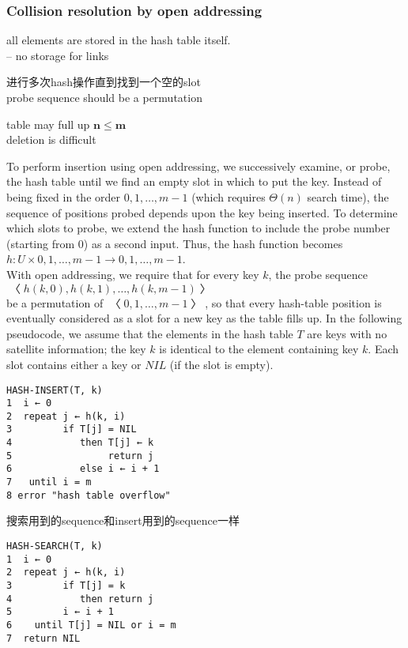 \documentclass{article}
\begin{document}
\subsubsection{Collision resolution by open addressing}
all elements are stored in the hash table itself.\\
-- no storage for links

进行多次hash操作直到找到一个空的slot\\
probe sequence should be a permutation

table may full up $\mathbf{n \leq m}$\\
deletion is difficult

To perform insertion using open addressing, we successively examine, or probe, the hash table until we find an empty slot in which to put the key. Instead of being fixed in the order $0, 1, \ldots, m - 1$ (which requires $\Theta(n)$ search time), the sequence of positions probed depends upon the key being inserted. To determine which slots to probe, we extend the hash function to include the probe number (starting from $0$) as a second input. Thus, the hash function becomes\\
$h : U \times {0, 1, \ldots, m - 1} \rightarrow {0, 1, \ldots, m - 1}$.\\
With open addressing, we require that for every key $k$, the probe sequence\\
$〈h(k,0),h(k,1), \ldots, h(k,m - 1)〉$\\
be a permutation of $〈0, 1, \ldots, m -1〉$, so that every hash-table position is eventually considered as a slot for a new key as the table fills up. In the following pseudocode, we assume that the elements in the hash table $T$ are keys with no satellite information; the key $k$ is identical to the element containing key $k$. Each slot contains either a key or $NIL$ (if the slot is empty).

\begin{verbatim}
HASH-INSERT(T, k)
1  i ← 0
2  repeat j ← h(k, i)
3         if T[j] = NIL
4            then T[j] ← k
5                 return j
6            else i ← i + 1
7   until i = m
8 error "hash table overflow"
\end{verbatim}

搜索用到的sequence和insert用到的sequence一样
\begin{verbatim}
HASH-SEARCH(T, k)
1  i ← 0
2  repeat j ← h(k, i)
3         if T[j] = k
4            then return j
5         i ← i + 1
6    until T[j] = NIL or i = m
7  return NIL
\end{verbatim}
\end{document}
